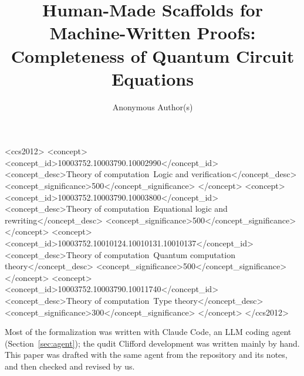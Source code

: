 \documentclass[acmsmall,review,anonymous]{acmart}
\begin{document}
\title[Human-Made Scaffolds for Machine-Written Proofs]{Human-Made
Scaffolds for Machine-Written Proofs: Completeness of Quantum Circuit
Equations}

\author{Anonymous Author(s)}

\begin{abstract}

\end{abstract}

\begin{CCSXML}
<ccs2012>
<concept>
<concept_id>10003752.10003790.10002990</concept_id>
<concept_desc>Theory of computation~Logic and verification</concept_desc>
<concept_significance>500</concept_significance>
</concept>
<concept>
<concept_id>10003752.10003790.10003800</concept_id>
<concept_desc>Theory of computation~Equational logic and rewriting</concept_desc>
<concept_significance>500</concept_significance>
</concept>
<concept>
<concept_id>10003752.10010124.10010131.10010137</concept_id>
<concept_desc>Theory of computation~Quantum computation theory</concept_desc>
<concept_significance>500</concept_significance>
</concept>
<concept>
<concept_id>10003752.10003790.10011740</concept_id>
<concept_desc>Theory of computation~Type theory</concept_desc>
<concept_significance>300</concept_significance>
</concept>
</ccs2012>
\end{CCSXML}


\maketitle












\begin{acks}
Most of the formalization was written with Claude Code, an LLM coding
agent (Section~\ref{sec:agent}); the qudit Clifford development was
written mainly by hand. This paper was drafted with the same agent
from the repository and its notes, and then checked and revised by us.
\end{acks}




\appendix

\end{document}
